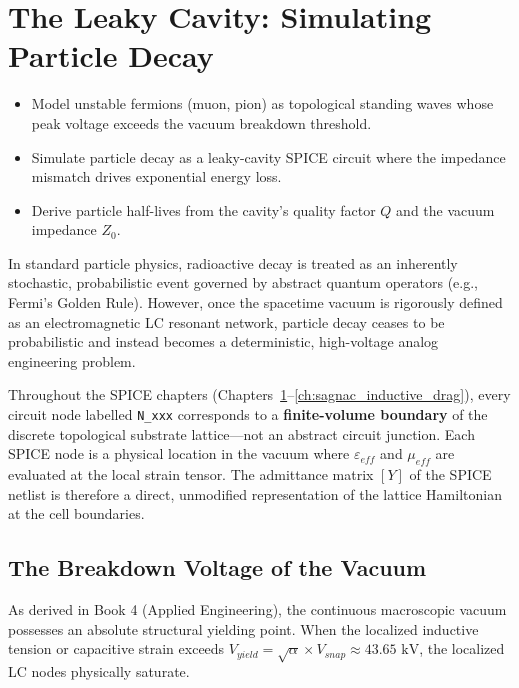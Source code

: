 \chapter{The Leaky Cavity: Simulating Particle Decay}
\label{ch:particle_decay}


\begin{objectivebox}
\begin{itemize}
    \item Model unstable fermions (muon, pion) as topological standing waves whose peak voltage exceeds the vacuum breakdown threshold.
    \item Simulate particle decay as a leaky-cavity SPICE circuit where the impedance mismatch drives exponential energy loss.
    \item Derive particle half-lives from the cavity's quality factor $Q$ and the vacuum impedance $Z_0$.
\end{itemize}
\end{objectivebox}

In standard particle physics, radioactive decay is treated as an inherently stochastic, probabilistic event governed by abstract quantum operators (e.g., Fermi's Golden Rule). However, once the spacetime vacuum is rigorously defined as an electromagnetic LC resonant network, particle decay ceases to be probabilistic and instead becomes a deterministic, high-voltage analog engineering problem.

\begin{tcolorbox}[colback=blue!3!white, colframe=blue!50!black, title={\textbf{SPICE Grounding Principle}}]
Throughout the SPICE chapters (Chapters~\ref{ch:particle_decay}--\ref{ch:sagnac_inductive_drag}), every circuit node labelled \texttt{N\_xxx} corresponds to a \textbf{finite-volume boundary} of the discrete topological substrate lattice---not an abstract circuit junction.  Each SPICE node is a physical location in the vacuum where $\varepsilon_{eff}$ and $\mu_{eff}$ are evaluated at the local strain tensor.  The admittance matrix $[Y]$ of the SPICE netlist is therefore a direct, unmodified representation of the lattice Hamiltonian at the cell boundaries.
\end{tcolorbox}

\section{The Breakdown Voltage of the Vacuum}
As derived in Book 4 (Applied Engineering), the continuous macroscopic vacuum possesses an absolute structural yielding point. When the localized inductive tension or capacitive strain exceeds $V_{yield} = \sqrt{\alpha} \times V_{snap} \approx 43.65 \text{ kV}$, the localized LC nodes physically saturate. 

